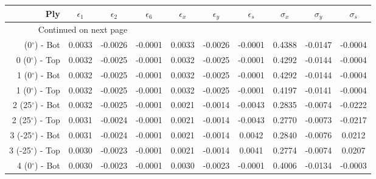 \begin{table}[H]
\caption{Strains and stresses. Stresses are in [GPa].}
\centering
\begin{longtable}{rccccccccc}

\toprule
Ply &  $\epsilon_1$ &  $\epsilon_2$ &  $\epsilon_6$ &  $\epsilon_x$ &  $\epsilon_y$ &  $\epsilon_s$ &  $\sigma_x$ &  $\sigma_y$ &  $\sigma_s$ \\
\midrule
\endhead
\midrule
\multicolumn{3}{r}{{Continued on next page}} \\
\midrule
\endfoot
\bottomrule
\endlastfoot
0 (0$^\circ$) - Bot   &        0.0033 &       -0.0026 &       -0.0001 &        0.0033 &       -0.0026 &       -0.0001 &      0.4388 &     -0.0147 &     -0.0004 \\
0 (0$^\circ$) - Top   &        0.0032 &       -0.0025 &       -0.0001 &        0.0032 &       -0.0025 &       -0.0001 &      0.4292 &     -0.0144 &     -0.0004 \\ \midrule
1 (0$^\circ$) - Bot   &        0.0032 &       -0.0025 &       -0.0001 &        0.0032 &       -0.0025 &       -0.0001 &      0.4292 &     -0.0144 &     -0.0004 \\
1 (0$^\circ$) - Top   &        0.0032 &       -0.0025 &       -0.0001 &        0.0032 &       -0.0025 &       -0.0001 &      0.4197 &     -0.0141 &     -0.0004 \\ \midrule
2 (25$^\circ$) - Bot  &        0.0032 &       -0.0025 &       -0.0001 &        0.0021 &       -0.0014 &       -0.0043 &      0.2835 &     -0.0074 &     -0.0222 \\
2 (25$^\circ$) - Top  &        0.0031 &       -0.0024 &       -0.0001 &        0.0021 &       -0.0014 &       -0.0043 &      0.2770 &     -0.0073 &     -0.0217 \\ \midrule
3 (-25$^\circ$) - Bot &        0.0031 &       -0.0024 &       -0.0001 &        0.0021 &       -0.0014 &        0.0042 &      0.2840 &     -0.0076 &      0.0212 \\
3 (-25$^\circ$) - Top &        0.0030 &       -0.0023 &       -0.0001 &        0.0021 &       -0.0014 &        0.0041 &      0.2774 &     -0.0074 &      0.0207 \\ \midrule
4 (0$^\circ$) - Bot   &        0.0030 &       -0.0023 &       -0.0001 &        0.0030 &       -0.0023 &       -0.0001 &      0.4006 &     -0.0134 &     -0.0003 \\

\end{longtable}
\end{table}
